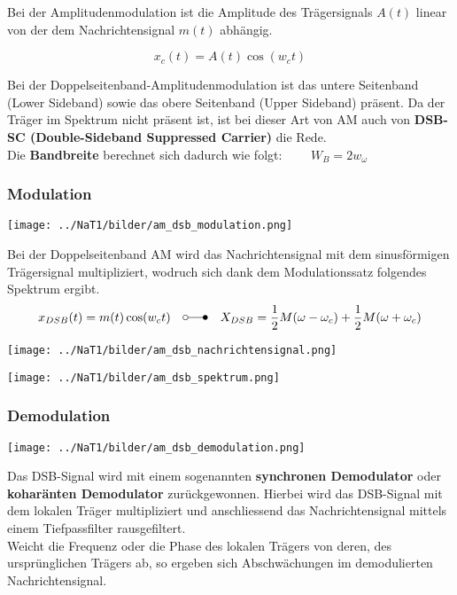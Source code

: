 Bei der Amplitudenmodulation ist die Amplitude des Trägersignals $A(t)$ linear von der dem
Nachrichtensignal $m(t)$ abhängig.

$$ x_c(t) = A(t) \cos(w_c t) $$




Bei der Doppelseitenband-Amplitudenmodulation ist das untere Seitenband (Lower
Sideband) sowie das
obere Seitenband (Upper Sideband) präsent. Da der Träger im Spektrum nicht
präsent ist, ist bei dieser Art von AM auch von \textbf{DSB-SC (Double-Sideband Suppressed Carrier)} die Rede. \\ 
Die \textbf{Bandbreite} berechnet sich dadurch wie folgt: $ \qquad W_B = 2 w_{\omega}$

\subsubsection{Modulation}
\begin{minipage}[c][2.7cm][t]{6.5cm}
    \texttt{[image: ../NaT1/bilder/am\_dsb\_modulation.png]}
\end{minipage}
\begin{minipage}[c][2.7cm][t]{11.5cm}
Bei der Doppelseitenband AM wird das Nachrichtensignal mit dem sinusförmigen Trägersignal
multipliziert, wodruch sich dank dem Modulationssatz folgendes Spektrum ergibt. \\
$$ x_{DSB}(t) =
m(t) \cos(w_c t) \quad \laplace \quad X_{DSB} = \frac{1}{2}M(\omega - \omega_c) + \frac{1}{2}M(\omega + \omega_c)$$
\end{minipage}

\begin{minipage}[t]{9.5cm}
    \texttt{[image: ../NaT1/bilder/am\_dsb\_nachrichtensignal.png]}
\end{minipage}
\begin{minipage}[t]{9cm}
    \texttt{[image: ../NaT1/bilder/am\_dsb\_spektrum.png]}
\end{minipage}

\subsubsection{Demodulation} 
\label{am_dsb_modulation}
\begin{minipage}[t][2.3cm][c]{6.5cm}
    \texttt{[image: ../NaT1/bilder/am\_dsb\_demodulation.png]}
\end{minipage}
\begin{minipage}[t][2.3cm][c]{11.5cm}
	Das DSB-Signal wird mit einem sogenannten \textbf{synchronen Demodulator} oder \textbf{koharänten
	Demodulator} zurückgewonnen. Hierbei wird das DSB-Signal mit dem lokalen Träger
	multipliziert und anschliessend das Nachrichtensignal mittels einem Tiefpassfilter rausgefiltert.
	\\ Weicht die Frequenz oder die Phase des lokalen Trägers von deren, des ursprünglichen Trägers ab, 
	so ergeben sich Abschwächungen im demodulierten Nachrichtensignal.
\end{minipage}

